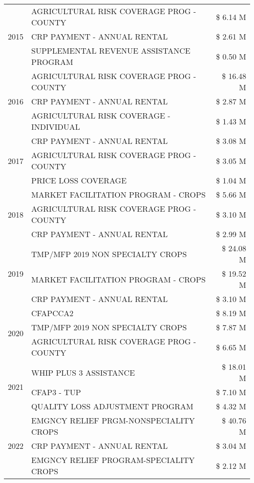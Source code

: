 \begin{tabular}{llr}
\cline{1-3}
\multirow[t]{3}{*}{2015} & AGRICULTURAL RISK COVERAGE PROG - COUNTY & \$ 6.14 M \\
 & CRP PAYMENT - ANNUAL RENTAL & \$ 2.61 M \\
 & SUPPLEMENTAL REVENUE ASSISTANCE PROGRAM & \$ 0.50 M \\
\cline{1-3}
\multirow[t]{3}{*}{2016} & AGRICULTURAL RISK COVERAGE PROG - COUNTY & \$ 16.48 M \\
 & CRP PAYMENT - ANNUAL RENTAL & \$ 2.87 M \\
 & AGRICULTURAL RISK COVERAGE - INDIVIDUAL & \$ 1.43 M \\
\cline{1-3}
\multirow[t]{3}{*}{2017} & CRP PAYMENT - ANNUAL RENTAL & \$ 3.08 M \\
 & AGRICULTURAL RISK COVERAGE PROG - COUNTY & \$ 3.05 M \\
 & PRICE LOSS COVERAGE & \$ 1.04 M \\
\cline{1-3}
\multirow[t]{3}{*}{2018} & MARKET FACILITATION PROGRAM - CROPS & \$ 5.66 M \\
 & AGRICULTURAL RISK COVERAGE PROG - COUNTY & \$ 3.10 M \\
 & CRP PAYMENT - ANNUAL RENTAL & \$ 2.99 M \\
\cline{1-3}
\multirow[t]{3}{*}{2019} & TMP/MFP 2019 NON SPECIALTY CROPS & \$ 24.08 M \\
 & MARKET FACILITATION PROGRAM - CROPS & \$ 19.52 M \\
 & CRP PAYMENT - ANNUAL RENTAL & \$ 3.10 M \\
\cline{1-3}
\multirow[t]{3}{*}{2020} & CFAPCCA2 & \$ 8.19 M \\
 & TMP/MFP 2019 NON SPECIALTY CROPS & \$ 7.87 M \\
 & AGRICULTURAL RISK COVERAGE PROG - COUNTY & \$ 6.65 M \\
\cline{1-3}
\multirow[t]{3}{*}{2021} & WHIP PLUS 3 ASSISTANCE & \$ 18.01 M \\
 & CFAP3 - TUP & \$ 7.10 M \\
 & QUALITY LOSS ADJUSTMENT PROGRAM & \$ 4.32 M \\
\cline{1-3}
\multirow[t]{3}{*}{2022} & EMGNCY RELIEF PRGM-NONSPECIALITY CROPS & \$ 40.76 M \\
 & CRP PAYMENT - ANNUAL RENTAL & \$ 3.04 M \\
 & EMGNCY RELIEF PROGRAM-SPECIALITY CROPS & \$ 2.12 M \\
\cline{1-3}
\bottomrule
\end{tabular}
